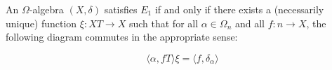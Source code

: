 An $\Omega$-algebra $(X, \delta)$ satisfies $E_1$ if and only if there exists a (necessarily unique) function $\xi: XT \longrightarrow X$ such that for all $\alpha \in \Omega_n$ and all $f: n \longrightarrow X$, the following diagram commutes in the appropriate sense:

$$\langle \alpha, fT \rangle \xi = \langle f, \delta_\alpha \rangle$$
